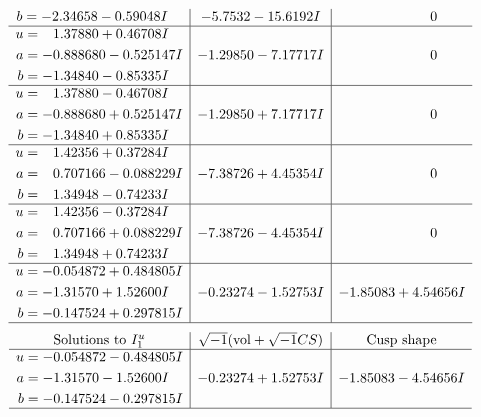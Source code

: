\documentclass[1p]{elsarticle_modified}
\theoremstyle{definition}
\newcommand{\I}{\sqrt{-1}}
\begin{document}
$$\begin{array}{c|c|c}
\begin{aligned}
b &= -2.34658 - 0.59048 I\end{aligned}
 & -5.7532 - 15.6192 I & \phantom{-0.000000 } 0 \\ \hline\begin{aligned}
u &= \phantom{-}1.37880 + 0.46708 I \\
a &= -0.888680 - 0.525147 I \\
b &= -1.34840 - 0.85335 I\end{aligned}
 & -1.29850 - 7.17717 I & \phantom{-0.000000 } 0 \\ \hline\begin{aligned}
u &= \phantom{-}1.37880 - 0.46708 I \\
a &= -0.888680 + 0.525147 I \\
b &= -1.34840 + 0.85335 I\end{aligned}
 & -1.29850 + 7.17717 I & \phantom{-0.000000 } 0 \\ \hline\begin{aligned}
u &= \phantom{-}1.42356 + 0.37284 I \\
a &= \phantom{-}0.707166 - 0.088229 I \\
b &= \phantom{-}1.34948 - 0.74233 I\end{aligned}
 & -7.38726 + 4.45354 I & \phantom{-0.000000 } 0 \\ \hline\begin{aligned}
u &= \phantom{-}1.42356 - 0.37284 I \\
a &= \phantom{-}0.707166 + 0.088229 I \\
b &= \phantom{-}1.34948 + 0.74233 I\end{aligned}
 & -7.38726 - 4.45354 I & \phantom{-0.000000 } 0 \\ \hline\begin{aligned}
u &= -0.054872 + 0.484805 I \\
a &= -1.31570 + 1.52600 I \\
b &= -0.147524 + 0.297815 I\end{aligned}
 & -0.23274 - 1.52753 I & -1.85083 + 4.54656 I\\
 \hline 
 \end{array}$$\newpage$$\begin{array}{c|c|c}  
\text{Solutions to }I^u_{1}& \I (\text{vol} + \sqrt{-1}CS) & \text{Cusp shape}\\
 \hline 
\begin{aligned}
u &= -0.054872 - 0.484805 I \\
a &= -1.31570 - 1.52600 I \\
b &= -0.147524 - 0.297815 I\end{aligned}
 & -0.23274 + 1.52753 I & -1.85083 - 4.54656 I\\
 \hline 
 \end{array}$$\newpage\newpage\renewcommand{\arraystretch}{1}
\end{document}
